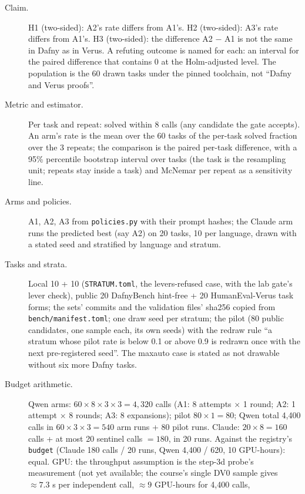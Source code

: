 \documentclass[11pt]{article}
\begin{document}
\begin{description}
\item[Claim.] H1 (two-sided): A2's rate differs from A1's. H2 (two-sided): A3's
  rate differs from A1's. H3 (two-sided): the difference A2 $-$ A1 is not the
  same in Dafny as in Verus. A refuting outcome is named for each: an interval
  for the paired difference that contains 0 at the Holm-adjusted level. The
  population is the 60 drawn tasks under the pinned toolchain, not ``Dafny and
  Verus proofs''.
\item[Metric and estimator.] Per task and repeat: solved within 8 calls (any
  candidate the gate accepts). An arm's rate is the mean over the 60 tasks of
  the per-task solved fraction over the 3 repeats; the comparison is the paired
  per-task difference, with a 95\% percentile bootstrap interval over tasks
  (the task is the resampling unit; repeats stay inside a task) and McNemar per
  repeat as a sensitivity line.
\item[Arms and policies.] A1, A2, A3 from \texttt{policies.py} with their
  prompt hashes; the Claude arm runs the predicted best (say A2) on 20 tasks,
  10 per language, drawn with a stated seed and stratified by language and
  stratum.
\item[Tasks and strata.] Local 10 + 10 (\texttt{STRATUM.toml}, the
  levers-refused case, with the lab gate's lever check), public 20 DafnyBench
  hint-free + 20 HumanEval-Verus task forms; the sets' commits and the
  validation files' sha256 copied from \texttt{bench/manifest.toml}; one draw
  seed per stratum; the pilot (80 public candidates, one sample each, its own
  seeds) with the redraw rule ``a stratum whose pilot rate is below 0.1 or
  above 0.9 is redrawn once with the next pre-registered seed''. The maxauto
  case is stated as not drawable without six more Dafny tasks.
\item[Budget arithmetic.] Qwen arms: $60 \times 8 \times 3 \times 3 = 4{,}320$
  calls (A1: 8 attempts $\times$ 1 round; A2: 1 attempt $\times$ 8 rounds; A3:
  8 expansions); pilot $80 \times 1 = 80$; Qwen total 4,400 calls in
  $60 \times 3 \times 3 = 540$ arm runs + 80 pilot runs. Claude: $20 \times 8
  = 160$ calls + at most 20 sentinel calls $= 180$, in 20 runs. Against the
  registry's \texttt{budget} (Claude 180 calls / 20 runs, Qwen 4,400 / 620, 10
  GPU-hours): equal. GPU: the throughput assumption is the step-3d probe's
  measurement (not yet available; the course's single DV0 sample gives
  $\approx 7.3$ s per independent call, $\approx 9$ GPU-hours for 4,400 calls,

\end{description}
\end{document}
